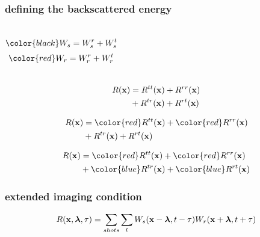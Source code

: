 \begin{frame} \frametitle{defining the backscattered energy}

\begin{columns}
\vspace{0.2in}
\[
\color{black} \US= \USr + \USt
\]
\vspace{0.3in}
\[
\color{red} \UR= \URr + \URt
\]
\end{columns}

\end{frame}














\begin{frame} 
\begin{align}
\nonumber R({\bf x}) &= R^{tt}({\bf x}) +R^{rr}({\bf x})\\
\nonumber             &+ R^{tr}({\bf x})+ R^{rt}({\bf x})
\end{align}
\end{frame}


\begin{frame} 
\begin{align}
\nonumber \R &= {\color{red} \Rc{tt}} + {\color{red} \Rc{rr}}\\
\nonumber             &+ \Rc{tr}+ \Rc{rt}
\end{align}
\end{frame}

\begin{frame} 
\begin{align}
\nonumber \R &= {\color{red} \Rc{tt}} + {\color{red} \Rc{rr}}\\
\nonumber             &+ {\color{blue} \Rc{tr} }+ {\color{blue} \Rc{rt}}
\end{align}
\end{frame}












\begin{frame}\frametitle{extended imaging condition}
\[
R({\bf x},{\boldsymbol{\lambda}},\tau) =  \sum_{shots} \sum_t {W_s}({\bf x}-{\boldsymbol{\lambda}},t-\tau) {W_r}({\bf x}+{\boldsymbol{\lambda}},t+\tau)
\]
\end{frame}


